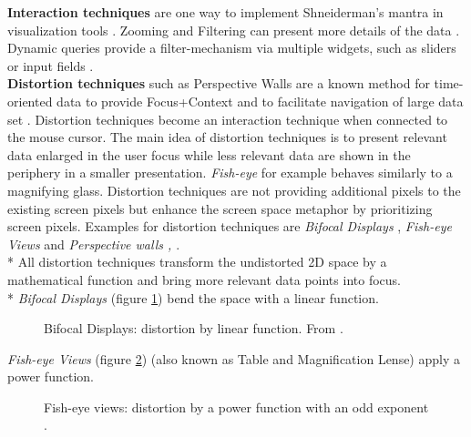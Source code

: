 \par
\textbf{Interaction techniques }are one way to implement Shneiderman's mantra in visualization tools \cite{Paterno1997, Shneiderman1996}. Zooming and Filtering can present more details of the data \cite{Keim2000Tut}. Dynamic queries provide a filter-mechanism via multiple widgets, such as sliders or input fields  \cite{Hochheiser2004,Shneiderman2008,Aigner2011}. \\
\textbf{Distortion techniques} such as Perspective Walls are a known method for time-oriented data to provide Focus+Context \cite{Stroe1999, Aigner2011} and to facilitate navigation of large data set . Distortion techniques become an interaction technique when connected to the mouse cursor.  
The main idea of distortion techniques is to present relevant data enlarged in the user focus while less relevant data are shown in the periphery in a smaller presentation. \textit{Fish-eye} for example behaves similarly to a magnifying glass. Distortion techniques are not providing additional pixels to the existing screen pixels but enhance the screen space metaphor by prioritizing screen pixels. 
Examples for distortion techniques are \textit{Bifocal Displays}  \cite{Spence1982}, \textit{Fish-eye Views} and \textit{Perspective walls \cite{Keim2005},  \cite{Mackinlay1991}}.\\*
All distortion techniques transform the undistorted 2D space by a mathematical function and bring more relevant data points into focus.\\* 
\textit{Bifocal Displays} (figure \ref{fig:bifocal}) bend the space with a linear function.
\begin{figure}[H]
    \centering
    \caption[Bifocal Displays]{Bifocal Displays: distortion by linear function. From  \cite{Stroe1999}.}
    \label{fig:bifocal}
\end{figure}
\textit{Fish-eye Views} (figure \ref{fig:fisheye}) (also known as Table and Magnification Lense) apply a power function.
\begin{figure}[H]
    \centering
    \caption[Fish-eye]{Fish-eye views:  distortion by a power function with an odd exponent  \cite{Stroe1999}.}
    \label{fig:fisheye}
\end{figure}

